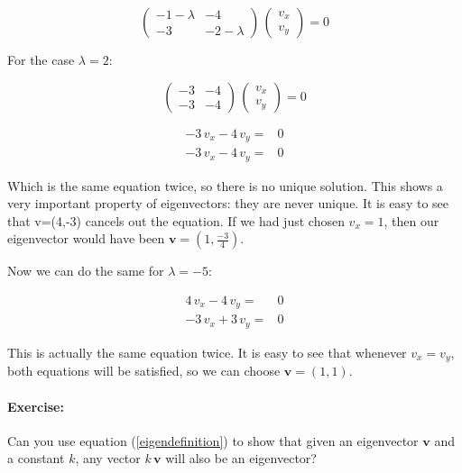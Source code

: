\documentclass{tufte-book} %
\begin{document}
\begin{equation}
\begin{pmatrix} -1-\lambda & -4\\ -3 & -2-\lambda\end{pmatrix} \, \begin{pmatrix} v_x \\  v_y\end{pmatrix} = 0 \nonumber
\end{equation}

For the case $\lambda = 2$:

\begin{equation}
	\begin{pmatrix} -3 & -4\\ -3 & -4\end{pmatrix} \, \begin{pmatrix} v_x \\  v_y\end{pmatrix} = 0 \nonumber
\end{equation}

\begin{align*}
	-3 \, v_x - 4 \, v_y =& 0 \nonumber\\
	-3 \, v_x - 4 \, v_y =& 0 \nonumber
\end{align*}

Which is the same equation twice, so there is no unique solution. This shows a very important property of eigenvectors: they are never unique. It is easy to see that v=(4,-3) cancels out the equation. If we had just chosen $v_x=1$, then our eigenvector would have been $\mathbf{v}=\left( 1,\frac{-3}{4} \right)$.

Now we can do the same for  $\lambda = -5$:

\begin{align*}
	4 \, v_x - 4 \, v_y =& 0 \nonumber\\
	- 3 \, v_x  + 3 \, v_y =& 0 \nonumber
\end{align*}

This is actually the same equation twice. It is easy to see that whenever $v_x=v_y$, both equations will be satisfied, so we can choose $\mathbf{v} = (1, 1)$.

\paragraph{Exercise:} Can you use equation (\ref{eigendefinition}) to show that given an eigenvector $\mathbf{v}$ and a constant $k$, any vector $k \, \mathbf{v}$ will also be an eigenvector?
\end{document}
